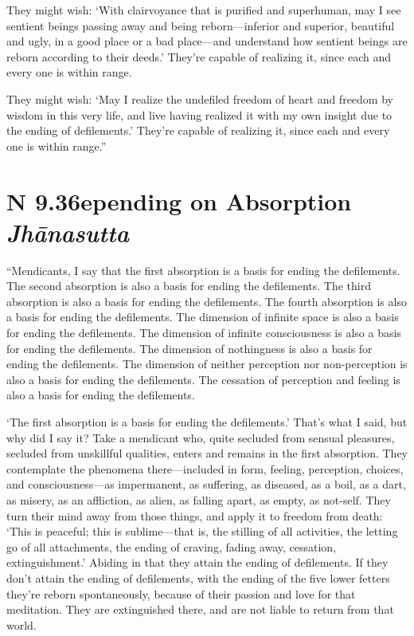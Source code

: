 \documentclass[12pt,openany]{book}%
\newcommand*{\suttatitleacronym}[1]{\smaller[2]{#1}\vspace*{.3em}}
\newcommand*{\suttatitletranslation}[1]{\linebreak{#1}}
\newcommand*{\suttatitleroot}[1]{\linebreak\smaller[2]\itshape{#1}}
\newcommand*{\tocacronym}[1]{\hspace*{-3.3em}{#1}\quad}
\newcommand*{\toctranslation}[1]{#1}
\newcommand*{\tocroot}[1]{(\textit{#1})}
\begin{document}
They might wish: ‘With clairvoyance that is purified and superhuman, may I see sentient beings passing away and being reborn—inferior and superior, beautiful and ugly, in a good place or a bad place—and understand how sentient beings are reborn according to their deeds.’ They’re capable of realizing it, since each and every one is within range. 

They might wish: ‘May I realize the undefiled freedom of heart and freedom by wisdom in this very life, and live having realized it with my own insight due to the ending of defilements.’ They’re capable of realizing it, since each and every one is within range.” 

%
\section*{{\suttatitleacronym AN 9.36}{\suttatitletranslation Depending on Absorption }{\suttatitleroot Jhānasutta}}
\addcontentsline{toc}{section}{\tocacronym{AN 9.36} \toctranslation{Depending on Absorption } \tocroot{Jhānasutta}}

“Mendicants, I say that the first absorption is a basis for ending the defilements. The second absorption is also a basis for ending the defilements. The third absorption is also a basis for ending the defilements. The fourth absorption is also a basis for ending the defilements. The dimension of infinite space is also a basis for ending the defilements. The dimension of infinite consciousness is also a basis for ending the defilements. The dimension of nothingness is also a basis for ending the defilements. The dimension of neither perception nor non-perception is also a basis for ending the defilements. The cessation of perception and feeling is also a basis for ending the defilements. 

‘The first absorption is a basis for ending the defilements.’ That’s what I said, but why did I say it? Take a mendicant who, quite secluded from sensual pleasures, secluded from unskillful qualities, enters and remains in the first absorption. They contemplate the phenomena there—included in form, feeling, perception, choices, and consciousness—as impermanent, as suffering, as diseased, as a boil, as a dart, as misery, as an affliction, as alien, as falling apart, as empty, as not-self. They turn their mind away from those things, and apply it to freedom from death: ‘This is peaceful; this is sublime—that is, the stilling of all activities, the letting go of all attachments, the ending of craving, fading away, cessation, extinguishment.’ Abiding in that they attain the ending of defilements. If they don’t attain the ending of defilements, with the ending of the five lower fetters they’re reborn spontaneously, because of their passion and love for that meditation. They are extinguished there, and are not liable to return from that world. 
\end{document}
